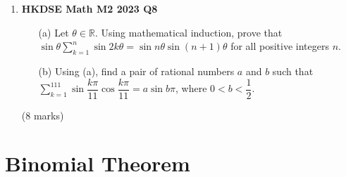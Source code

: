 \documentclass{report}
\begin{document}
\begin{enumerate}
	\item \textbf{HKDSE Math M2 2023 Q8}
	\begin{enumerate}
		\item [(a)]Let $\theta \in \mathbb{R}$. Using mathematical induction, prove that $\displaystyle \sin{\theta}\sum_{k=1}^{n}\sin{2k\theta} = \sin{n\theta}\sin{(n+1)\theta}$ for all positive integers $n$.
		\item [(b)] Using (a), find a pair of rational numbers $a$ and $b$ such that $\displaystyle\sum_{k = 1}^{111}\sin{\dfrac{k\pi}{11}}\cos{\dfrac{k\pi}{11}} = a\sin{b\pi}$, where $0 < b < \dfrac{1}{2}$.
	\end{enumerate}
	(8 marks)

\end{enumerate}

\chapter{Binomial Theorem}
\end{document}
